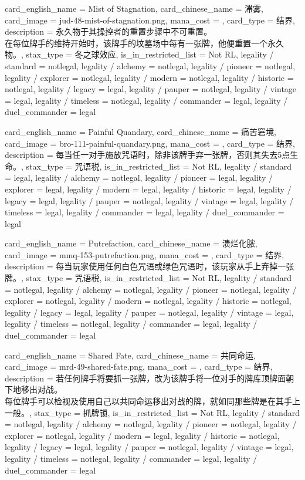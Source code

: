 \documentclass[lang = cn, color = black, 10pt]{AllThatStax}
\begin{document}
\card
{
	card_english_name = {Mist of Stagnation},
	card_chinese_name = {滞雾},
	card_image = jud-48-mist-of-stagnation.png,
	mana_cost = ,
	card_type = 结界,
	description = {永久物于其操控者的重置步骤中不可重置。\\
在每位牌手的维持开始时，该牌手的坟墓场中每有一张牌，他便重置一个永久物。},
	stax_type = 冬之球效应,
	is_in_restricted_list = Not RL,
	legality / standard = notlegal,
	legality / alchemy = notlegal,
	legality / pioneer = notlegal,
	legality / explorer = notlegal,
	legality / modern = notlegal,
	legality / historic = notlegal,
	legality / legacy = legal,
	legality / pauper = notlegal,
	legality / vintage = legal,
	legality / timeless = notlegal,
	legality / commander = legal,
	legality / duel_commander = legal
}

\card
{
	card_english_name = {Painful Quandary},
	card_chinese_name = {痛苦窘境},
	card_image = bro-111-painful-quandary.png,
	mana_cost = ,
	card_type = 结界,
	description = {每当任一对手施放咒语时，除非该牌手弃一张牌，否则其失去5点生命。},
	stax_type = 咒语税,
	is_in_restricted_list = Not RL,
	legality / standard = legal,
	legality / alchemy = notlegal,
	legality / pioneer = legal,
	legality / explorer = legal,
	legality / modern = legal,
	legality / historic = legal,
	legality / legacy = legal,
	legality / pauper = notlegal,
	legality / vintage = legal,
	legality / timeless = legal,
	legality / commander = legal,
	legality / duel_commander = legal
}

\card
{
	card_english_name = {Putrefaction},
	card_chinese_name = {溃烂化脓},
	card_image = mmq-153-putrefaction.png,
	mana_cost = ,
	card_type = 结界,
	description = {每当玩家使用任何白色咒语或绿色咒语时，该玩家从手上弃掉一张牌。},
	stax_type = 咒语税,
	is_in_restricted_list = Not RL,
	legality / standard = notlegal,
	legality / alchemy = notlegal,
	legality / pioneer = notlegal,
	legality / explorer = notlegal,
	legality / modern = notlegal,
	legality / historic = notlegal,
	legality / legacy = legal,
	legality / pauper = notlegal,
	legality / vintage = legal,
	legality / timeless = notlegal,
	legality / commander = legal,
	legality / duel_commander = legal
}

\card
{
	card_english_name = {Shared Fate},
	card_chinese_name = {共同命运},
	card_image = mrd-49-shared-fate.png,
	mana_cost = ,
	card_type = 结界,
	description = {若任何牌手将要抓一张牌，改为该牌手将一位对手的牌库顶牌面朝下地移出对战。\\
每位牌手可以检视及使用自己以共同命运移出对战的牌，就如同那些牌是在其手上一般。},
	stax_type = 抓牌锁,
	is_in_restricted_list = Not RL,
	legality / standard = notlegal,
	legality / alchemy = notlegal,
	legality / pioneer = notlegal,
	legality / explorer = notlegal,
	legality / modern = legal,
	legality / historic = notlegal,
	legality / legacy = legal,
	legality / pauper = notlegal,
	legality / vintage = legal,
	legality / timeless = notlegal,
	legality / commander = legal,
	legality / duel_commander = legal
}
\end{document}
